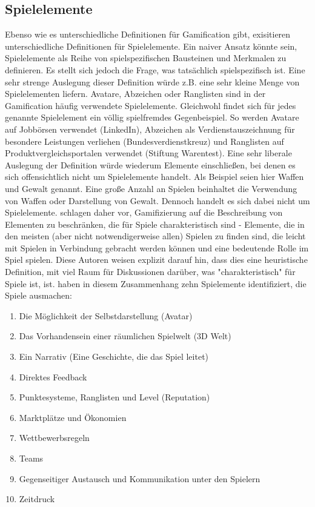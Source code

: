 \subsection{Spielelemente}\label{gamelelements}
Ebenso wie es unterschiedliche Definitionen für Gamification gibt, exisitieren unterschiedliche Definitionen für Spielelemente. Ein naiver Ansatz könnte sein, Spielelemente als Reihe von spielspezifischen Bausteinen und Merkmalen zu definieren. Es stellt sich jedoch die Frage, was tatsächlich spielspezifisch ist. Eine sehr strenge Auslegung dieser Definition würde z.B. eine sehr kleine Menge von Spielelementen liefern. Avatare, Abzeichen oder Ranglisten sind in der Gamification häufig verwendete Spielelemente. Gleichwohl findet sich für jedes genannte Spielelement ein völlig spielfremdes Gegenbeispiel. So werden Avatare auf Jobbörsen verwendet (LinkedIn), Abzeichen als Verdienstauszeichnung für besondere Leistungen verliehen (Bundesverdienstkreuz) und Ranglisten auf Produktvergleichsportalen verwendet (Stiftung Warentest). Eine sehr liberale Auslegung der Definition würde wiederum Elemente einschließen, bei denen es sich offensichtlich nicht um Spielelemente handelt. Als Beispiel seien hier Waffen und Gewalt genannt. Eine große Anzahl an Spielen beinhaltet die Verwendung von Waffen oder Darstellung von Gewalt. Dennoch handelt es sich dabei nicht um Spielelemente.  schlagen daher vor, Gamifizierung auf die Beschreibung von Elementen zu beschränken, die für Spiele charakteristisch sind - Elemente, die in den meisten (aber nicht notwendigerweise allen) Spielen zu finden sind, die leicht mit Spielen in Verbindung gebracht werden können und eine bedeutende Rolle im Spiel spielen. Diese Autoren weisen explizit darauf hin, dass dies eine heuristische Definition, mit viel Raum für Diskussionen darüber, was "charakteristisch" für Spiele ist, ist.  haben in diesem Zusammenhang zehn Spielemente identifiziert, die  Spiele ausmachen:

\begin{enumerate}
  \item Die Möglichkeit der Selbstdarstellung (Avatar)
  \item Das Vorhandensein einer räumlichen Spielwelt (3D Welt)
  \item Ein Narrativ (Eine Geschichte, die das Spiel leitet)
  \item Direktes Feedback
  \item Punktesysteme, Ranglisten und Level (Reputation)
  \item Marktplätze und Ökonomien
  \item Wettbewerbsregeln 
  \item Teams
  \item Gegenseitiger Austausch und Kommunikation unter den Spielern
  \item Zeitdruck
\end{enumerate}

